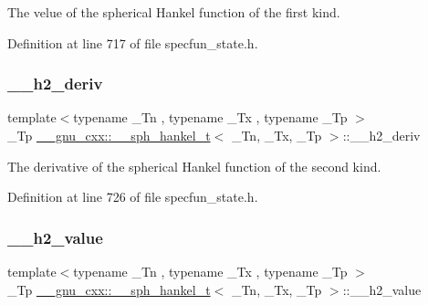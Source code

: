 The velue of the spherical Hankel function of the first kind. 



Definition at line 717 of file specfun\+\_\+state.\+h.

\mbox{\label{struct____gnu__cxx_1_1____sph__hankel__t_a7b6cbd23f269cf3b0c76d1fc21bede4d}} 
\subsubsection{\texorpdfstring{\+\_\+\+\_\+h2\+\_\+deriv}{\_\_h2\_deriv}}
{\footnotesize\ttfamily template$<$typename \+\_\+\+Tn , typename \+\_\+\+Tx , typename \+\_\+\+Tp $>$ \\
\+\_\+\+Tp \hyperlink{struct____gnu__cxx_1_1____sph__hankel__t}{\+\_\+\+\_\+gnu\+\_\+cxx\+::\+\_\+\+\_\+sph\+\_\+hankel\+\_\+t}$<$ \+\_\+\+Tn, \+\_\+\+Tx, \+\_\+\+Tp $>$\+::\+\_\+\+\_\+h2\+\_\+deriv}



The derivative of the spherical Hankel function of the second kind. 



Definition at line 726 of file specfun\+\_\+state.\+h.

\mbox{\label{struct____gnu__cxx_1_1____sph__hankel__t_a225e48ba2faafbdabd65cd173372d418}} 
\subsubsection{\texorpdfstring{\+\_\+\+\_\+h2\+\_\+value}{\_\_h2\_value}}
{\footnotesize\ttfamily template$<$typename \+\_\+\+Tn , typename \+\_\+\+Tx , typename \+\_\+\+Tp $>$ \\
\+\_\+\+Tp \hyperlink{struct____gnu__cxx_1_1____sph__hankel__t}{\+\_\+\+\_\+gnu\+\_\+cxx\+::\+\_\+\+\_\+sph\+\_\+hankel\+\_\+t}$<$ \+\_\+\+Tn, \+\_\+\+Tx, \+\_\+\+Tp $>$\+::\+\_\+\+\_\+h2\+\_\+value}



